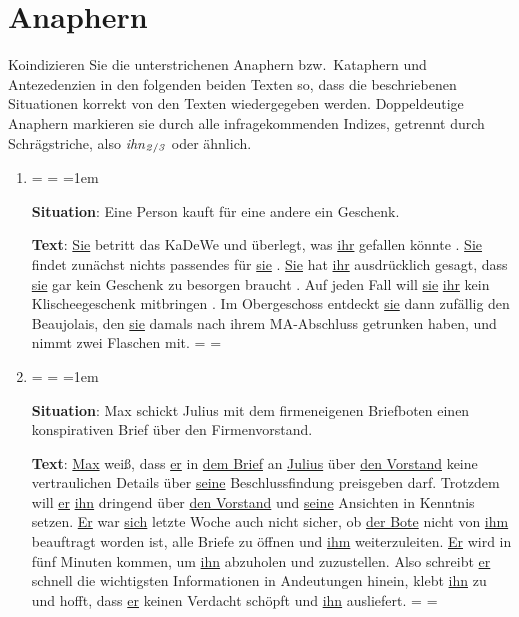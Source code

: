 \documentclass[12pt,a4paper,twoside]{article}
\newcommand{\Sub}[1]{\ensuremath{_{\text{#1}}}}
\newcommand{\Zeile}{\vspace{\baselineskip}}
\newenvironment{spread}
{%
  \newdimen\origiwspc%
  \newdimen\origiwstr%
  \origiwspc=\fontdimen2\font%
  \origiwstr=\fontdimen3\font%
  \fontdimen2\font=1em%
  \doublespacing%
}{%
  \fontdimen2\font=\origiwspc%
  \fontdimen3\font=\origiwstr%
}
\begin{document}
\newpage

\section{Anaphern}

Koindizieren Sie die unterstrichenen Anaphern bzw.\ Kataphern und Antezedenzien in den folgenden beiden Texten so, dass die beschriebenen Situationen korrekt von den Texten wiedergegeben werden.
Doppeldeutige Anaphern markieren sie durch alle infragekommenden Indizes, getrennt durch Schrägstriche, also \textit{ihn}\Sub{\textit{2}\slash\textit{3}} oder ähnlich.

\begin{enumerate}
  \item\doublespacing%
    \begin{spread}
      \textbf{Situation}: Eine Person kauft für eine andere ein Geschenk.
      
      \textbf{Text}: \uline{Sie} betritt das KaDeWe und überlegt, was \uline{ihr} gefallen könnte .
      \uline{Sie} findet zunächst nichts passendes für \uline{sie} .
      \uline{Sie} hat \uline{ihr} ausdrücklich gesagt, dass \uline{sie} gar kein Geschenk zu besorgen braucht .
      Auf jeden Fall will \uline{sie} \uline{ihr} kein Klischeegeschenk mitbringen .
      Im Obergeschoss entdeckt \uline{sie} dann zufällig den Beaujolais, den \uline{sie} damals nach ihrem MA-Abschluss getrunken haben, und nimmt zwei Flaschen mit.\end{spread}
    \Zeile
  \item\doublespacing
    \begin{spread}
      \textbf{Situation}: Max schickt Julius mit dem firmeneigenen Briefboten einen konspirativen Brief über den Firmenvorstand.

      \textbf{Text}: \uline{Max} weiß, dass \uline{er} in \uline{dem Brief} an \uline{Julius} über \uline{den Vorstand} keine vertraulichen Details über \uline{seine} Beschlussfindung preisgeben darf.
      Trotzdem will \uline{er} \uline{ihn} dringend über \uline{den Vorstand} und \uline{seine} Ansichten in Kenntnis setzen.
      \uline{Er} war \uline{sich} letzte Woche auch nicht sicher, ob \uline{der Bote} nicht von \uline{ihm} beauftragt worden ist, alle Briefe zu öffnen und \uline{ihm} weiterzuleiten.
      \uline{Er} wird in fünf Minuten kommen, um \uline{ihn} abzuholen und zuzustellen.
      Also schreibt \uline{er} schnell die wichtigsten Informationen in Andeutungen hinein, klebt \uline{ihn} zu und hofft, dass \uline{er} keinen Verdacht schöpft und \uline{ihn} ausliefert.
  \end{spread}
\end{enumerate}
\end{document}
